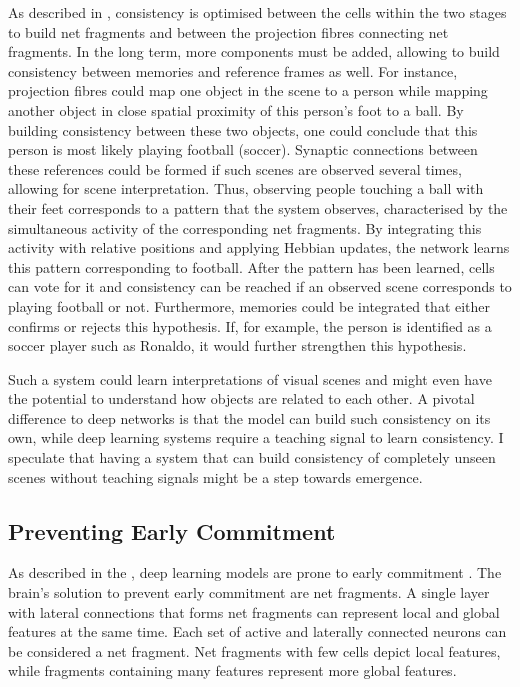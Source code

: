 As described in , consistency is optimised between the cells within the two stages to build net fragments and between the projection fibres connecting net fragments.
In the long term, more components must be added, allowing to build consistency between memories and reference frames as well.
For instance, projection fibres could map one object in the scene to a person while mapping another object in close spatial proximity of this person's foot to a ball. By building consistency between these two objects, one could conclude that this person is most likely playing football (soccer). Synaptic connections between these references could be formed if such scenes are observed several times, allowing for scene interpretation.
Thus, observing people touching a ball with their feet corresponds to a pattern that the system observes, characterised by the simultaneous activity of the corresponding net fragments. By integrating this activity with relative positions and applying Hebbian updates, the network learns this pattern corresponding to football. 
After the pattern has been learned, cells can vote for it and consistency can be reached if an observed scene corresponds to playing football or not.
Furthermore, memories could be integrated that either confirms or rejects this hypothesis. If, for example, the person is identified as a soccer player such as Ronaldo, it would further strengthen this hypothesis.

Such a system could learn interpretations of visual scenes and might even have the potential to understand how objects are related to each other. A pivotal difference to deep networks is that the model can build such consistency on its own, while deep learning systems require a teaching signal to learn consistency.
I speculate that having a system that can build consistency of completely unseen scenes without teaching signals might be a step towards emergence.


\subsection{Preventing Early Commitment}
As described in the , deep learning models are prone to early commitment .
The brain's solution to prevent early commitment are net fragments.
A single layer with lateral connections that forms net fragments can represent local and global features at the same time.
Each set of active and laterally connected neurons can be considered a net fragment. Net fragments with few cells depict local features, while fragments containing many features represent more global features.

